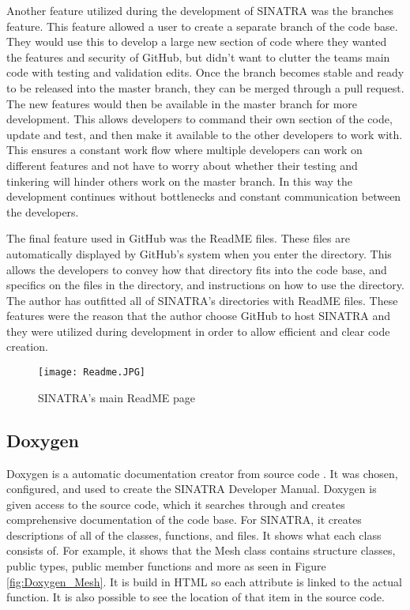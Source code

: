 \indent Another feature utilized during the development of SINATRA was the branches feature. This feature allowed a user to create a separate branch of the code base. They would use this to develop a large new section of code where they wanted the features and security of GitHub, but didn't want to clutter the teams main code with testing and validation edits. Once the branch becomes stable and ready to be released into the master branch, they can be merged through a pull request. The new features would then be available in the master branch for more development. This allows developers to command their own section of the code, update and test, and then make it available to the other developers to work with. This ensures a constant work flow where multiple developers can work on different features and not have to worry about whether their testing and tinkering will hinder others work on the master branch. In this way the development continues without bottlenecks and constant communication between the developers. \par
\indent The final feature used in GitHub was the ReadME files. These files are automatically displayed by GitHub's system when you enter the directory. This allows the developers to convey how that directory fits into the code base, and specifics on the files in the directory, and instructions on how to use the directory. The author has outfitted all of SINATRA's directories with ReadME files. These features were the reason that the author choose GitHub to host SINATRA and they were utilized during development in order to allow efficient and clear code creation. 

\begin{figure}
\texttt{[image: Readme.JPG]}
\centering
\caption{SINATRA's main ReadME page}
\label{fig:readme}
\end{figure}


\subsection{Doxygen}
Doxygen is a automatic documentation creator from source code \cite{doxygen}. It was chosen, configured, and used to create the SINATRA Developer Manual. Doxygen is given access to the source code, which it searches through and creates comprehensive documentation of the code base. For SINATRA, it creates descriptions of all of the classes, functions, and files. It shows what each class consists of. For example, it shows that the Mesh class contains structure classes, public types, public member functions and more as seen in Figure \ref{fig:Doxygen_Mesh}. It is build in HTML so each attribute is linked to the actual function. It is also possible to see the location of that item in the source code. \par

